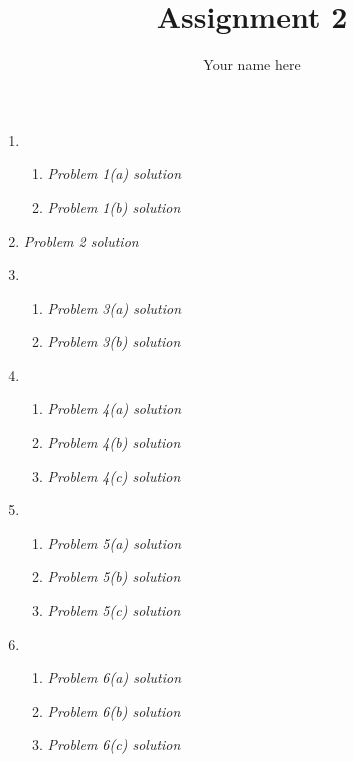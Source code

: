 \documentclass[11pt]{article}
\title{Assignment 2}
\author{Your name here}
\date{}
\begin{document}
\maketitle


\begin{enumerate}
\item
  \begin{enumerate}
   \item
    \textsl{Problem 1(a) solution}
   \item
    \textsl{Problem 1(b) solution}
  \end{enumerate}
\item
  \textsl{Problem 2 solution}
\item
  \begin{enumerate}
   \item
    \textsl{Problem 3(a) solution}
   \item
    \textsl{Problem 3(b) solution}
  \end{enumerate}
\item
  \begin{enumerate}
   \item
    \textsl{Problem 4(a) solution}
   \item
    \textsl{Problem 4(b) solution}
   \item
    \textsl{Problem 4(c) solution}
  \end{enumerate}
\item
  \begin{enumerate}
   \item
    \textsl{Problem 5(a) solution}
   \item
    \textsl{Problem 5(b) solution}
   \item
    \textsl{Problem 5(c) solution}
  \end{enumerate}
\item
  \begin{enumerate}
   \item
    \textsl{Problem 6(a) solution}
   \item
    \textsl{Problem 6(b) solution}
   \item
    \textsl{Problem 6(c) solution}
  \end{enumerate}
  
\end{enumerate}
\end{document}
